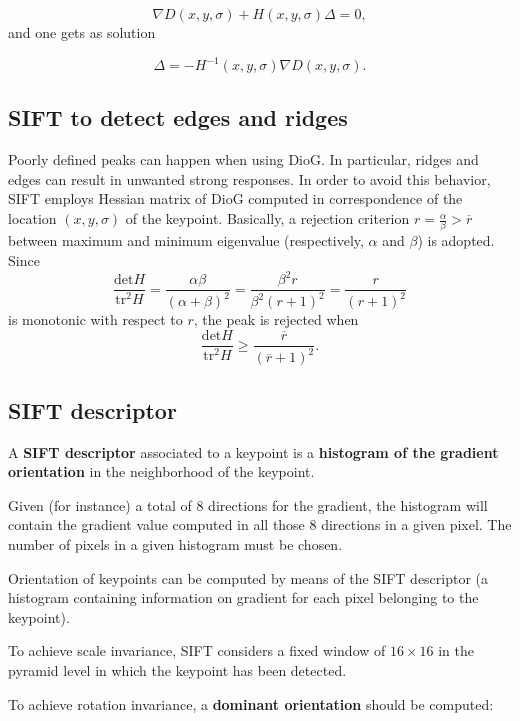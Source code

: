 \documentclass[10pt]{report}
\begin{document}
\[ \nabla D (x, y, \sigma) + H(x, y, \sigma)\Delta = 0,\] and one gets
as solution

\[\Delta = -H^{-1}(x, y, \sigma) \nabla D(x, y, \sigma).\]

\subsection{SIFT to detect edges and ridges}
\label{sift-to-detect-edges-and-ridges}
Poorly defined peaks can happen when using DioG. In particular, ridges
and edges can result in unwanted strong responses. In order to avoid
this behavior, SIFT employs Hessian matrix of DioG computed in
correspondence of the location \((x, y, \sigma)\) of the keypoint.
Basically, a rejection criterion
\(r = \frac{\alpha}{\beta} > \overline{r}\) between maximum and minimum
eigenvalue (respectively, \(\alpha\) and \(\beta\)) is adopted. Since
\[\frac{\mbox{det} H}{\mbox{tr}^2 H} = \frac{\alpha \beta}{(\alpha + \beta)^2} = \frac{\beta^2 r}{\beta^2(r + 1)^2} = \frac{r}{(r + 1)^2}\]
is monotonic with respect to \(r\), the peak is rejected when
\[\frac{\mbox{det} H}{\mbox{tr}^2 H} \geq \frac{\overline{r}}{(\overline{r} + 1)^2}.\]

\subsection{SIFT descriptor}
\label{sift-descriptor}
A \textbf{SIFT descriptor} associated to a keypoint is a \textbf{histogram of the
gradient orientation} in the neighborhood of the keypoint.

Given (for instance) a total of \(8\) directions for the gradient, the
histogram will contain the gradient value computed in all those \(8\)
directions in a given pixel. The number of pixels in a given histogram
must be chosen.

Orientation of keypoints can be computed by means of the SIFT descriptor
(a histogram containing information on gradient for each pixel belonging
to the keypoint).

To achieve scale invariance, SIFT considers a fixed window of
\(16 \times 16\) in the pyramid level in which the keypoint has been
detected.

To achieve rotation invariance, a \textbf{dominant orientation} should be
computed:
\end{document}
